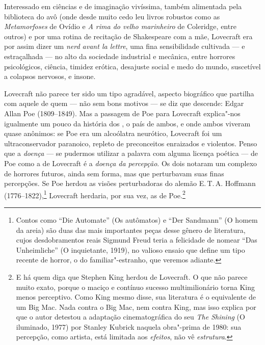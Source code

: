 Interessado em ciências e de imaginação vivíssima, também alimentada
pela biblioteca do avô (onde desde muito cedo leu livros robustos como
as \emph{Metamorfoses} de Ovídio e \emph{A rima do velho marinheiro} de
Coleridge, entre outros) e por uma rotina de recitação de Shakespeare
com a mãe, Lovecraft era por assim dizer um \emph{nerd avant la lettre},
uma fina sensibilidade cultivada --- e estraçalhada --- no alto da
sociedade industrial e mecânica, entre horrores psicológicos, ciência,
timidez erótica, desajuste social e medo do mundo, suscetível a colapsos
nervosos, e insone.

Lovecraft não parece ter sido um tipo agradável, aspecto biográfico que
partilha com aquele de quem --- não sem bons motivos --- se diz que
descende: Edgar Allan Poe (1809--1849). Mas a passagem de Poe para
Lovecraft explica"-nos igualmente um pouco da história dos , o país de
ambos, e onde ambos viveram quase anônimos: se Poe era um alcoólatra
neurótico, Lovecraft foi um ultraconservador paranoico, repleto de
preconceitos enraizados e violentos. Penso que a \emph{doença} --- se
pudermos utilizar a palavra com alguma licença poética --- de Poe como a
de Lovecraft é a \emph{doença da percepção}. Os dois notaram um complexo
de horrores futuros, ainda sem forma, mas que perturbavam suas finas
percepções. Se Poe herdou as visões perturbadoras do alemão E.\,T.\,A.
Hoffmann (1776--1822),\footnote{Contos como ``Die Automate'' (Os autômatos)
  e ``Der Sandmann'' (O homem da areia) são duas das mais importantes
  peças desse gênero de literatura, cujos desdobramentos reais Sigmund
  Freud teria a felicidade de nomear ``Das Unheimliche'' (O inquietante,
  1919), no valioso ensaio que define um tipo recente de horror, o do
  familiar"-estranho, que veremos adiante.} Lovecraft herdaria, por sua
vez, as de Poe.\footnote{E há quem diga que Stephen King herdou de
  Lovecraft. O que não parece muito exato, porque o maciço e contínuo
  sucesso multimilionário torna King menos perceptivo. Como King mesmo
  disse, sua literatura é o equivalente de um Big Mac. Nada contra o Big
  Mac, nem contra King, mas isso explica por que o autor detestou a
  adaptação cinematográfica do seu \emph{The Shining} (O iluminado,
  1977) por Stanley Kubrick naquela obra"-prima de 1980: sua percepção,
  como artista, está limitada aos \emph{efeitos}, não vê
  \emph{estrutura}.}

